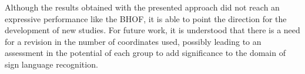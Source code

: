 Although the results obtained with the presented approach did not reach an expressive performance like the BHOF, it is able to point the direction for the development of new studies. For future work, it is understood that there is a need for a revision in the number of coordinates used, possibly leading to an assessment in the potential of each group to add significance to the domain of sign language recognition.







